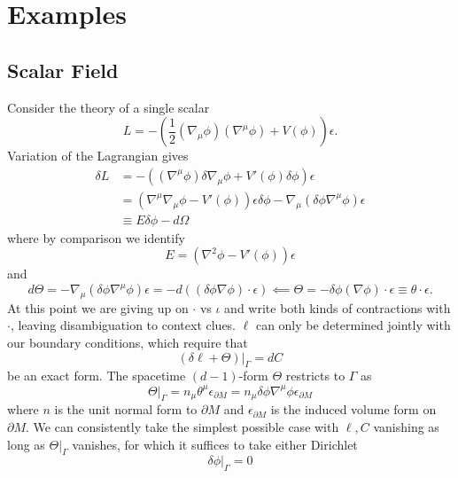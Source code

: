 \documentclass[11pt,letterpaper]{article}
\newcommand{\LP}{\left(}
\newcommand{\RP}{\right)}
\newcommand{\D}{\partial}
\begin{document}
\section{Examples}

\subsection{Scalar Field}
Consider the theory of a single scalar \begin{equation}
L = - \LP \frac{1}{2} (\nabla_\mu \phi) (\nabla^\mu \phi) + V(\phi) \RP \epsilon.
\end{equation}
Variation of the Lagrangian gives \begin{equation}
\begin{aligned}
\delta L & = - \LP ( \nabla^\mu \phi) \delta \nabla_\mu \phi + V'(\phi) \delta \phi \RP \epsilon \\
& = \LP \nabla^\mu \nabla_\mu \phi - V'(\phi) \RP \epsilon \delta \phi - \nabla_\mu (\delta \phi \nabla^\mu \phi  ) \epsilon \\
& \equiv E \delta \phi - d \Omega
\end{aligned}
\end{equation}
where by comparison we identify \begin{equation}
E = (\nabla^2 \phi - V'(\phi) ) \epsilon
\end{equation}
and \begin{equation}
d \Theta = - \nabla_\mu (\delta \phi \nabla^\mu \phi) \epsilon = - d \LP (\delta \phi \nabla \phi) \cdot \epsilon \RP \impliedby \Theta = - \delta \phi (\nabla \phi) \cdot \epsilon \equiv \theta \cdot \epsilon.
\end{equation}
At this point we are giving up on $\cdot$ vs $\iota$ and write both kinds of contractions with $\cdot$, leaving disambiguation to context clues. $\ell$ can only be determined jointly with our boundary conditions, which require that \begin{equation}
(\delta \ell + \Theta)|_\Gamma = d C
\end{equation}
be an exact form. The spacetime $(d-1)$-form $\Theta$ restricts to $\Gamma$ as \begin{equation}
 \Theta|_\Gamma = n_\mu \theta^\mu \epsilon_{\D M} = n_\mu \delta \phi \nabla^\mu \phi \epsilon_{\D M}
\end{equation}
where $n$ is the unit normal form to $\D M$ and $\epsilon_{\D M}$ is the induced volume form on $\D M$. We can consistently take the simplest possible case with $\ell, C$ vanishing as long as $\Theta|_\Gamma$ vanishes, for which it suffices to take either Dirichlet \begin{equation}
\delta \phi|_\Gamma = 0
\end{equation}
\end{document}

